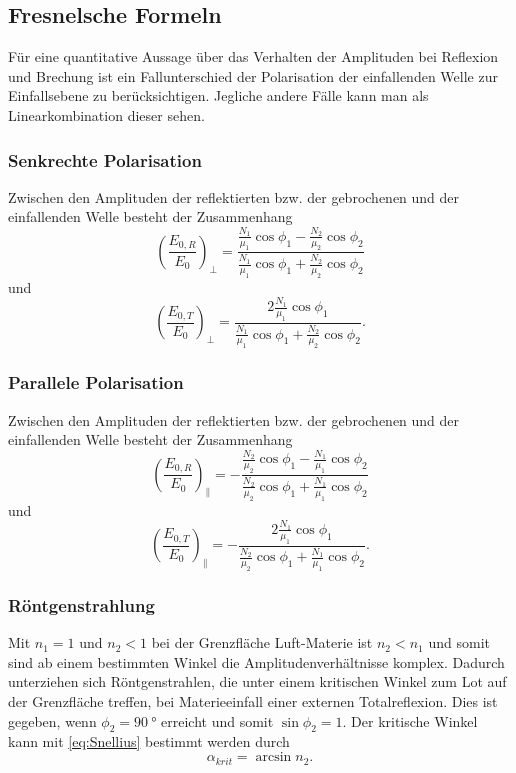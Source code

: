 \subsection{Fresnelsche Formeln}
Für eine quantitative Aussage über das Verhalten der Amplituden bei Reflexion und Brechung ist ein Fallunterschied der Polarisation der einfallenden Welle zur Einfallsebene zu berücksichtigen.
Jegliche andere Fälle kann man als Linearkombination dieser sehen.\cite{physik}
\subsubsection*{Senkrechte Polarisation}
Zwischen den Amplituden der reflektierten bzw. der gebrochenen und der einfallenden Welle besteht der Zusammenhang
\begin{equation}
    \left(\frac{E_{0,R}}{E_0}\right)_\perp = \frac{\frac{N_1}{\mu_1}\cos\phi_1 - \frac{N_2}{\mu_2}\cos\phi_2}{\frac{N_1}{\mu_1}\cos\phi_1 + \frac{N_2}{\mu_2}\cos\phi_2}
\end{equation}
und
\begin{equation}
    \left(\frac{E_{0,T}}{E_0}\right)_\perp = \frac{2\frac{N_1}{\mu_1}\cos\phi_1}{\frac{N_1}{\mu_1}\cos\phi_1 + \frac{N_2}{\mu_2}\cos\phi_2}\text{.}
\end{equation}
\subsubsection*{Parallele Polarisation}
Zwischen den Amplituden der reflektierten bzw. der gebrochenen und der einfallenden Welle besteht der Zusammenhang
\begin{equation}
    \left(\frac{E_{0,R}}{E_0}\right)_\parallel = -\frac{\frac{N_2}{\mu_2}\cos\phi_1 - \frac{N_1}{\mu_1}\cos\phi_2}{\frac{N_2}{\mu_2}\cos\phi_1 + \frac{N_1}{\mu_1}\cos\phi_2}
\end{equation}
und
\begin{equation}
    \left(\frac{E_{0,T}}{E_0}\right)_\parallel = -\frac{2\frac{N_1}{\mu_1}\cos\phi_1}{\frac{N_2}{\mu_2}\cos\phi_1 + \frac{N_1}{\mu_1}\cos\phi_2}\text{.}
\end{equation}
\subsubsection*{Röntgenstrahlung}
Mit $n_1 = 1$ und $n_2 < 1$ bei der Grenzfläche Luft-Materie ist $n_2 < n_1$ und somit sind ab einem bestimmten Winkel die Amplitudenverhältnisse komplex.\cite{nolting}
Dadurch unterziehen sich Röntgenstrahlen, die unter einem kritischen Winkel zum Lot auf der Grenzfläche treffen, bei Materieeinfall einer externen Totalreflexion.\cite{reflexion}
Dies ist gegeben, wenn $\phi_2 = \qty{90}{\degree}$ erreicht und somit $\sin\phi_2 = 1$. Der kritische Winkel kann mit \autoref{eq:Snellius} bestimmt werden durch
\begin{equation}
    \alpha_{krit} = \arcsin n_2 \text{.}
\end{equation}

